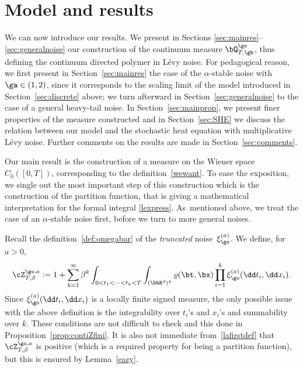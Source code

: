 \section{Model and results}

We can now introduce our results. We present in Sections \ref{sec:mainres}--\ref{sec:generalnoise} our construction of the continuum measure $\bQ_{T,\gb}^{\go}$,
thus defining the continuum directed polymer in Lévy noise.
For pedagogical reason, we first present in Section~\ref{sec:mainres} the case of the $\alpha$-stable noise with $\ga\in (1,2)$, since it corresponds
to the scaling limit of the model introduced in Section~\ref{sec:discrete} above;
we turn afterward in Section~\ref{sec:generalnoise} to the case of a general heavy-tail noise.
In Section~\ref{sec:mainprop},
we present finer properties of the
measure constructed
and
in Section~\ref{sec:SHE} we discuss the
relation between our model
and the stochastic heat equation with multiplicative Lévy noise.
Further comments on the results are
made in Section~\ref{sec:comments}.

\label{sec:mainres}

Our main result is the construction of a measure on the Wiener space $C_0([0,T])$,
corresponding to the definition~\eqref{wewant}.
To ease the exposition, we single out the most important step of this construction which is the construction of the partition function,
that is giving a mathematical interpretation for the formal integral \eqref{lexpress}.
As~mentioned above, we treat the case of an $\alpha$-stable noise first,
before we turn to more general noises.

Recall the definition~\eqref{def:omegabar}
of the \textit{truncated} noise~$\xi_{\go}^{(a)}$.
We define, for $a>0$,
\begin{equation}\label{lafirstdef}
\cZ^{\go,a}_{T,\beta}:=1+\sum_{k=1}^\infty \beta^k\int_{0<t_1<\dots<t_k<T}\int_{(\bbR^d)^k} \varrho(\bt,\bx) \prod_{i=1}^k \xi_{\go}^{(a)} (\dd t_i, \dd x_i).
\end{equation}
Since $\xi_{\go}^{(a)} (\dd t_i, \dd x_i)$ is a locally finite signed measure, the only possible issue with the above definition is the integrability over $t_i$'s and $x_i$'s and summability over $k$. These conditions are not difficult to check and this done in Proposition~\ref{prop:contiZfini}.
It is also not immediate from~\eqref{lafirstdef} that
$\cZ^{\go,a}_{T,\beta}$ is positive (which is a required property for being a partition function), but this is ensured by Lemma~\ref{eazy}.

